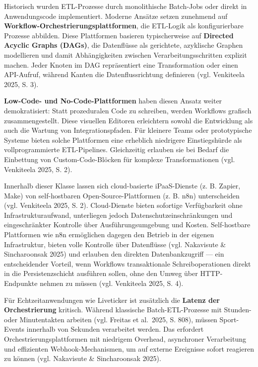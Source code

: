 Historisch wurden ETL-Prozesse durch monolithische Batch-Jobs oder
direkt in Anwendungscode implementiert. Moderne Ansätze setzen zunehmend
auf \textbf{Workflow-Orchestrierungsplattformen}, die ETL-Logik als
konfigurierbare Prozesse abbilden. Diese Plattformen basieren
typischerweise auf \textbf{Directed Acyclic Graphs (DAGs)}, die
Datenflüsse als gerichtete, azyklische Graphen modellieren und damit
Abhängigkeiten zwischen Verarbeitungsschritten explizit machen. Jeder
Knoten im DAG repräsentiert eine Transformation oder einen API-Aufruf,
während Kanten die Datenflussrichtung definieren (vgl. Venkiteela 2025,
S. 3).

\textbf{Low-Code- und No-Code-Plattformen} haben diesen Ansatz weiter
demokratisiert: Statt prozeduralen Code zu schreiben, werden Workflows
grafisch zusammengestellt. Diese visuellen Editoren erleichtern sowohl
die Entwicklung als auch die Wartung von Integrationspfaden. Für
kleinere Teams oder prototypische Systeme bieten solche Plattformen eine
erheblich niedrigere Einstiegshürde als vollprogrammierte ETL-Pipelines.
Gleichzeitig erlauben sie bei Bedarf die Einbettung von
Custom-Code-Blöcken für komplexe Transformationen (vgl. Venkiteela 2025,
S. 2).

Innerhalb dieser Klasse lassen sich cloud-basierte iPaaS-Dienste (z. B.
Zapier, Make) von self-hostbaren Open-Source-Plattformen (z. B. n8n)
unterscheiden (vgl. Venkiteela 2025, S. 2). Cloud-Dienste bieten
sofortige Verfügbarkeit ohne Infrastrukturaufwand, unterliegen jedoch
Datenschutzeinschränkungen und eingeschränkter Kontrolle über
Ausführungsumgebung und Kosten. Self-hostbare Plattformen wie n8n
ermöglichen dagegen den Betrieb in der eigenen Infrastruktur, bieten
volle Kontrolle über Datenflüsse (vgl. Nakavisute \& Sincharoonsak 2025)
und erlauben den direkten Datenbankzugriff --- ein entscheidender
Vorteil, wenn Workflows transaktionale Schreiboperationen direkt in die
Persistenzschicht ausführen sollen, ohne den Umweg über HTTP-Endpunkte
nehmen zu müssen (vgl. Venkiteela 2025, S. 4).

Für Echtzeitanwendungen wie Liveticker ist zusätzlich die \textbf{Latenz
der Orchestrierung} kritisch. Während klassische Batch-ETL-Prozesse mit
Stunden- oder Minutentakten arbeiten (vgl. Freitas et al.~2025, S. 808),
müssen Sport-Events innerhalb von Sekunden verarbeitet werden. Das
erfordert Orchestrierungsplattformen mit niedrigem Overhead, asynchroner
Verarbeitung und effizienten Webhook-Mechanismen, um auf externe
Ereignisse sofort reagieren zu können (vgl. Nakavisute \& Sincharoonsak
2025).

